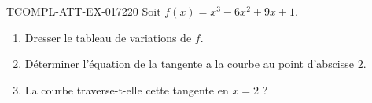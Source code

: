 \begin{exercice}{TCOMPL-ATT-EX-017}{2}{20}
Soit $f(x) = x^3 - 6x^2 + 9x + 1$.
\begin{enumerate}
  \item Dresser le tableau de variations de $f$.
  \item Déterminer l'équation de la tangente a la courbe au point d'abscisse $2$.
  \item La courbe traverse-t-elle cette tangente en $x = 2$ ?
\end{enumerate}

\end{exercice}
